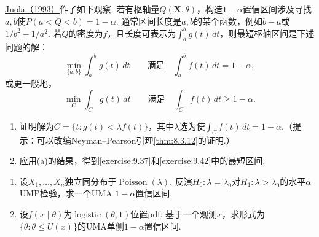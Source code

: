 \begin{exercise}\label{exercise:9.43}
\hyperref[bib:source184]{Juola（1993）}作了如下观察. 若有枢轴量$Q(\boldsymbol X,\theta)$，构造$1-\alpha$置信区间涉及寻找$a,b$使$P(a<Q<b)=1-\alpha$. 通常区间长度是$a,b$的某个函数，例如$b-a$或$1/b^2-1/a^2$. 若$Q$的密度为$f$，且长度可表示为$\int_a^b g(t)\,dt$，则最短枢轴区间是下述问题的解：
$$\min_{\{a,b\}}\int_a^b g(t)\,dt\qquad\text{满足}\quad\int_a^b f(t)\,dt=1-\alpha,$$
或更一般地，
$$\min_C\int_C g(t)\,dt\qquad\text{满足}\quad\int_C f(t)\,dt\ge1-\alpha.$$
\begin{enumerate}
\item\label{item:9.43.a}证明解为$C=\{t:g(t)<\lambda f(t)\}$，其中$\lambda$选为使$\int_C f(t)\,dt=1-\alpha$.（提示：可以改编Neyman--Pearson引理\autoref{thm:8.3.12}的证明.）
\item 应用\hyperref[item:9.43.a]{(a)}的结果，得到\autoref{exercise:9.37}和\autoref{exercise:9.42}中的最短区间.
\end{enumerate}
\end{exercise}
\begin{exercise}\label{exercise:9.44}\leavevmode
\begin{enumerate}
\item 设$X_1,\ldots,X_n$独立同分布于$\operatorname{Poisson}(\lambda)$. 反演$H_0:\lambda=\lambda_0$对$H_1:\lambda>\lambda_0$的水平$\alpha$ UMP检验，求一个UMA $1-\alpha$置信区间.
\item 设$f(x\mid\theta)$为$\operatorname{logistic}(\theta,1)$位置pdf. 基于一个观测$x$，求形式为$\{\theta:\theta\le U(x)\}$的UMA单侧$1-\alpha$置信区间.
\end{enumerate}
\end{exercise}
